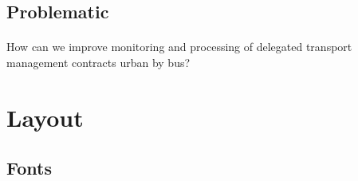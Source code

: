 
\subsection{Problematic}
\begin{frame}{\insertsectionhead}
  \framesubtitle{\insertsubsectionhead}
  How can we improve monitoring and 
  processing of delegated transport management contracts
  urban by bus?
\end{frame}
\section{Layout}



\subsection{Fonts}

